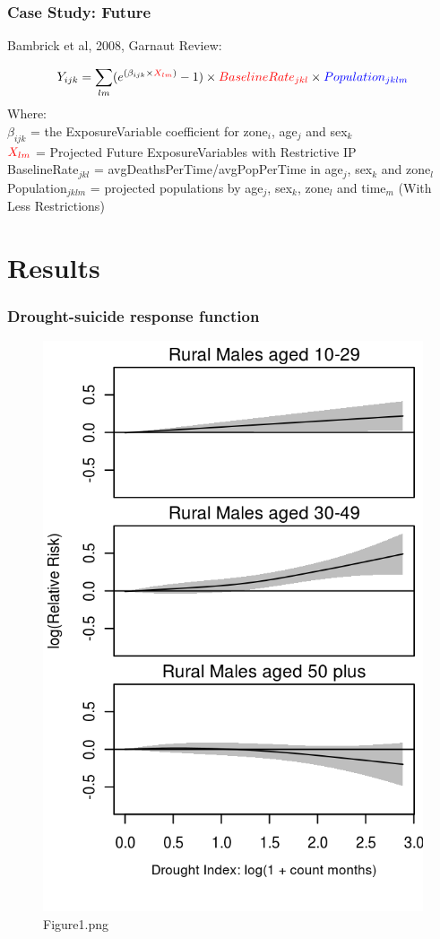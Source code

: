 \documentclass[bigger]{beamer}
\begin{document}
\begin{frame}
\frametitle{Case Study: Future}
\label{sec-2-9}

Bambrick et al, 2008, Garnaut Review:
\begin{footnotesize}
$$Y_{ijk}=\sum_{lm}(e^{(\beta_{ijk} \times {\color{red} X_{lm}})} - 1) \times {\color{red}BaselineRate_{jkl}} \times {\color{blue} Population_{jklm}}$$
\noindent Where:\\
$\beta_{ijk}$ = the ExposureVariable coefficient for zone$_i$, age$_j$ and sex$_{k}$ \\
${\color{red}X_{lm}}$ = Projected Future ExposureVariables {\color{red} with Restrictive IP} \\
{\color{red}BaselineRate$_{jkl}$} = {\color{red}avgDeathsPerTime}/{\color{blue}avgPopPerTime} in age$_j$, sex$_k$ and zone$_l$ \\
{\color{blue}Population$_{jklm}$} = projected populations by age$_j$, sex$_k$, zone$_l$ and time$_m$ {\color{blue} (With Less Restrictions)}\\

\end{footnotesize}
\end{frame}
\section{Results}
\label{sec-3}
\begin{frame}
\frametitle{Drought-suicide response function}
\label{sec-3-1}

\begin{figure}[!h]
\centering
\includegraphics[width=.45\textwidth]{Figure1.png}
\caption{Figure1.png}
\label{fig:Figure1.png}
\end{figure}
\end{frame}
\end{document}
